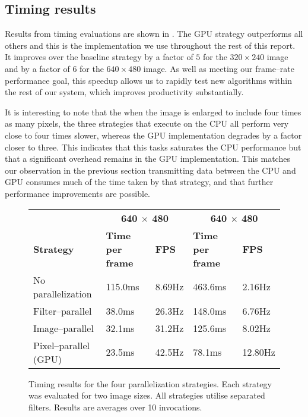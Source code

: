\subsection{Timing results}
Results from timing evaluations are shown in
. The GPU strategy outperforms all others and
this is the implementation we use throughout the rest of this
report. It improves over the baseline strategy by a factor of $5$ for
the $320 \times 240$ image and by a factor of $6$ for the $640 \times
480$ image. As well as meeting our frame--rate performance
goal, this speedup allows us to rapidly test new algorithms within the
rest of our system, which improves productivity substantially.

It is interesting to note that the when the image is enlarged to
include four times as many pixels, the three strategies that execute
on the CPU all perform very close to four times slower, whereas the
GPU implementation degrades by a factor closer to three. This
indicates that this tasks saturates the CPU performance but that a
significant overhead remains in the GPU implementation. This matches
our observation in the previous section transmitting data between the
CPU and GPU consumes much of the time taken by that strategy, and that
further performance improvements are possible.

\begin{figure}[htp]
\centering
\begin{tabular}{ l || l | l | l | l | }
  & \multicolumn{2}{c|}{\textbf{640 $\times$ 480}}
    & \multicolumn{2}{c|}{\textbf{640 $\times$ 480}} \\
  \textbf{Strategy} & \textbf{Time per frame} & \textbf{FPS}
    & \textbf{Time per frame} & \textbf{FPS} \\
  \hline
  No parallelization & 115.0ms & 8.69Hz & 463.6ms & 2.16Hz \\
  Filter--parallel & 38.0ms & 26.3Hz & 148.0ms & 6.76Hz \\
  Image--parallel & 32.1ms & 31.2Hz & 125.6ms & 8.02Hz \\
  Pixel--parallel (GPU) & 23.5ms & 42.5Hz & 78.1ms & 12.80Hz \\
\end{tabular}
\caption{Timing results for the four parallelization strategies. Each
  strategy was evaluated for two image sizes. All strategies utilise
  separated filters. Results are averages over 10 invocations.}
\label{fig:convolve-timing}
\end{figure}


